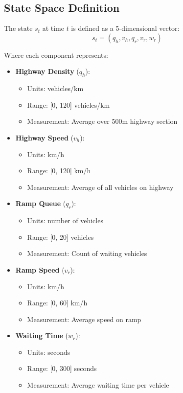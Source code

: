 \documentclass[a4paper, 12pt]{article}
\begin{document}
\subsection{State Space Definition}
\begin{tcolorbox}[title=State Representation]
The state \( s_t \) at time \( t \) is defined as a 5-dimensional vector:
\[
s_t = (q_h, v_h, q_r, v_r, w_r)
\]

Where each component represents:
\begin{itemize}
    \item \textbf{Highway Density} (\( q_h \)):
    \begin{itemize}
        \item Units: vehicles/km
        \item Range: [0, 120] vehicles/km
        \item Measurement: Average over 500m highway section
    \end{itemize}
    
    \item \textbf{Highway Speed} (\( v_h \)):
    \begin{itemize}
        \item Units: km/h
        \item Range: [0, 120] km/h
        \item Measurement: Average of all vehicles on highway
    \end{itemize}
    
    \item \textbf{Ramp Queue} (\( q_r \)):
    \begin{itemize}
        \item Units: number of vehicles
        \item Range: [0, 20] vehicles
        \item Measurement: Count of waiting vehicles
    \end{itemize}
    
    \item \textbf{Ramp Speed} (\( v_r \)):
    \begin{itemize}
        \item Units: km/h
        \item Range: [0, 60] km/h
        \item Measurement: Average speed on ramp
    \end{itemize}
    
    \item \textbf{Waiting Time} (\( w_r \)):
    \begin{itemize}
        \item Units: seconds
        \item Range: [0, 300] seconds
        \item Measurement: Average waiting time per vehicle
    \end{itemize}
\end{itemize}
\end{tcolorbox}
\end{document}

